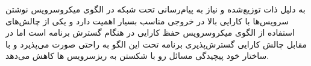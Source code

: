 به دلیل ذات توزیع‌شده و نیاز به پیام‌رسانی تحت شبکه در الگوی میکروسرویس نوشتن سرویس‌ها با کارایی بالا در خروجی مناسب بسیار اهمیت دارد و یکی از چالش‌های استفاده از الگوی میکروسرویس حفظ کارایی در هنگام گسترش برنامه است اما در مقابل چالش کارایی گسترش‌پذیری برنامه تحت این الگو به راحتی صورت می‌پذیرد و با ساختار خود پیچیدگی مسائل رو با شکستن به ریز‌سرویس ها کاهش می‌دهد.
























